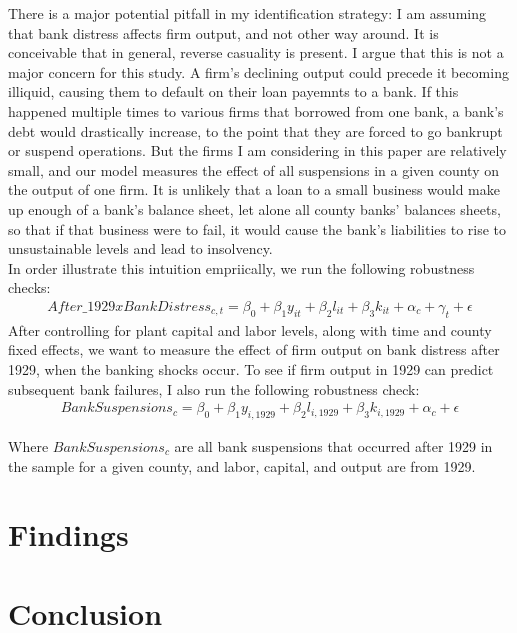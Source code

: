 \documentclass[letter,11pt]{article}
\begin{document}
{There is a major potential pitfall in my identification strategy: I am assuming that bank distress affects firm output, and not other way around. It is conceivable that in general, reverse casuality is present. I argue that this is not a major concern for this study. A firm's declining output could precede it becoming illiquid, causing them to default on their loan payemnts to a bank. If this happened multiple times to various firms that borrowed from one bank, a bank's debt would drastically increase, to the point that they are forced to go bankrupt or suspend operations. But the firms I am considering in this paper are relatively small, and our model measures the effect of all suspensions in a given county on the output of one firm. It is unlikely that a loan to a small business would make up enough of a bank's balance sheet, let alone all county banks' balances sheets, so that if that business were to fail, it would cause the bank's liabilities to rise to unsustainable levels and lead to insolvency. 
\\
\indent In order illustrate this intuition empriically, we run the following robustness checks:
\begin{align*}
After\_1929 x BankDistress_{c,t} = \beta_0  + \beta_1 y_{it} + \beta_2 l_{it} + \beta_3 k_{it} + \alpha_c + \gamma_t + \epsilon
\end{align*}
After controlling for plant capital and labor levels, along with time and county fixed effects, we want to measure the effect of firm output on bank distress after 1929, when the banking shocks occur. To see if firm output in 1929 can predict subsequent bank failures, I also run the following robustness check:
\begin{align*}
BankSuspensions_c  =  \beta_0+ \beta_1 y_{i, 1929} + \beta_2 l_{i, 1929} + \beta_3 k_{i, 1929} + \alpha_c  + \epsilon
\end{align*}

Where $BankSuspensions_c$ are all bank suspensions that occurred after 1929 in the sample for a given county, and labor, capital, and output are from 1929. 

\section{Findings}

\section{Conclusion}

}
\end{document}
